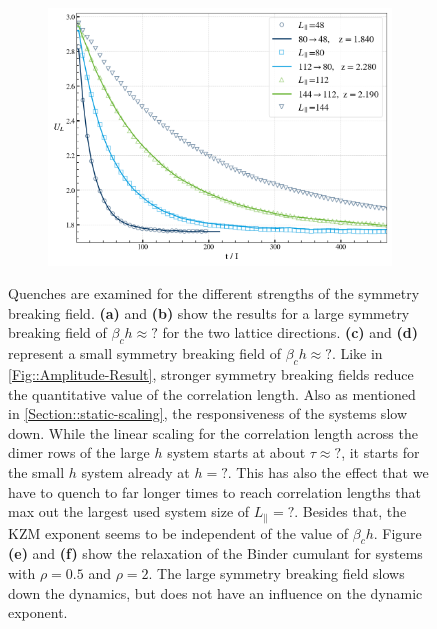 \begin{figure}
\begin{subfigure}{0.475\textwidth}
	\end{subfigure}
	\begin{subfigure}{0.475\textwidth}
		\centering		
		\includegraphics[width=0.96\linewidth]{graphics/z-h-2.png}
	\end{subfigure}
	\caption{Quenches are examined for the different strengths of the symmetry breaking field. \textbf{(a)} and \textbf{(b)} show the results for a large symmetry breaking field of $\beta_c h \approx ?$ for the two lattice directions. 	\textbf{(c)} and \textbf{(d)} represent a small symmetry breaking field of $\beta_c h \approx ?	$.  Like in \autoref{Fig::Amplitude-Result}, stronger symmetry breaking fields reduce the quantitative value of the correlation length. Also as mentioned in \autoref{Section::static-scaling}, the responsiveness of the systems slow down. While the linear scaling for the correlation length across the dimer rows of the large $h$ system starts at about $\tau \approx ?$, it starts for the small $h$ system already at $h = ?$. This has also the effect that we have to quench to far longer times to reach correlation lengths that max out the largest used system size of $L_\parallel = ?$. Besides that, the KZM exponent seems to be independent of the value of $\beta_c h$. Figure \textbf{(e)} and \textbf{(f)} show the relaxation of the Binder cumulant for systems with $\rho = 0.5$ and $\rho = 2$. The large symmetry breaking field slows down the dynamics, but does not have an influence on the dynamic exponent.}
	\label{Fig::Quench-Result-h}
	\end{figure}		
